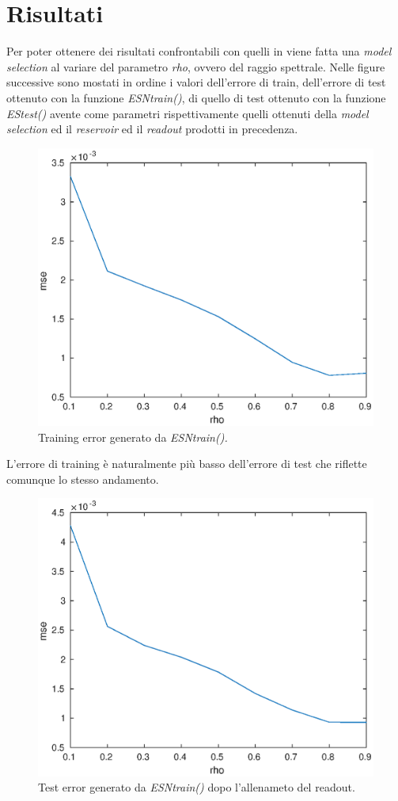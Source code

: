 \section{Risultati}
Per poter ottenere dei risultati confrontabili con quelli in \cite{Markovianfactor:paper} viene fatta una \textit{model selection} al variare del parametro \textit{rho}, ovvero del raggio spettrale. Nelle figure successive sono mostati in ordine i valori dell'errore di train, dell'errore di test ottenuto con la funzione \textit{ESNtrain()}, di quello di test ottenuto con la funzione \textit{EStest()} avente come parametri rispettivamente quelli ottenuti della \textit{model selection} ed il \textit{reservoir} ed il \textit{readout} prodotti in precedenza.

\begin{figure}[h!]
	\centering 
	\includegraphics[width=0.7\linewidth]{immagini/trainingerror.eps}
	\caption{Training error generato da \textit{ESNtrain().}}
	\label{fig:trainingerror}
\end{figure}
L'errore di training è naturalmente più basso dell'errore di test che riflette comunque lo stesso andamento.\\
\begin{figure}[H]
	\centering 
	\includegraphics[width=0.6\linewidth]{immagini/testaftertrain}
	\caption{Test error generato da \textit{ESNtrain()} dopo l'allenameto del readout.}
	\label{fig:testaftertrain}
\end{figure}
